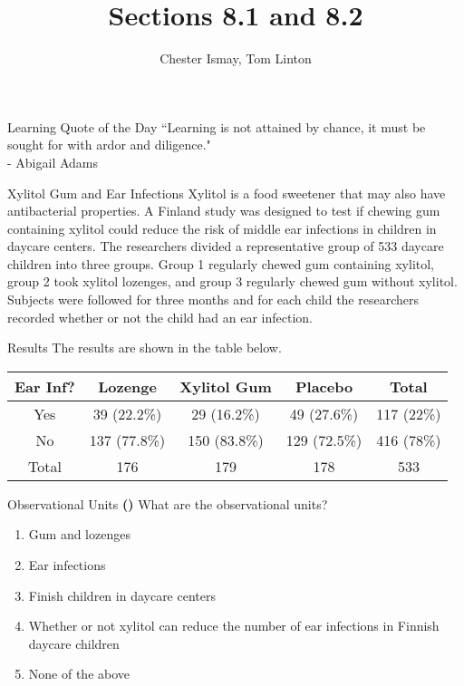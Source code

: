 \documentclass[13pt]{beamer}
\title{Sections 8.1 and 8.2 }
\author{Chester Ismay, Tom Linton}
\institute{Ripon College, Central College}
\date{}
\newcounter{count}
\newcommand{\quotes}[2]{\centering \Large{``#1"\\
\vspace*{0.2in}
\hspace*{0.5in} - #2}}
\newcommand{\question}{ \textbf{(\decimal{count})} \stepcounter{count}}
\newenvironment{click}{\begin{enumerate}[A]}{\end{enumerate}}
\begin{document}
\begin{frame}
  \titlepage
\end{frame}


\begin{frame}{Learning Quote of the Day}
\quotes{Learning is not attained by chance, it must be sought for with ardor and diligence.}{Abigail Adams}

\end{frame}

\begin{frame}{Xylitol Gum and Ear Infections}
Xylitol is a food sweetener that may also have antibacterial properties. A Finland study was designed to test if chewing gum containing xylitol could reduce the risk of middle ear infections in children in daycare centers. The researchers divided a representative group of 533 daycare children into three groups. Group 1 regularly chewed gum containing xylitol, group 2 took xylitol lozenges, and group 3 regularly chewed gum without xylitol. Subjects were followed for three months and for each child the researchers recorded whether or not the child had an ear infection.
\end{frame}

\begin{frame}{Results}
The results are shown in the table below.
\begin{center}
\begin{tabular}
[c]{|c||c|c|c|c|}\hline
Ear Inf? & Lozenge & Xylitol Gum & Placebo & Total\\\hline
Yes & 39 (22.2\%) & 29 (16.2\%) & 49 (27.6\%) & 117 (22\%)\\\hline
No & 137 (77.8\%) & 150 (83.8\%) & 129 (72.5\%) & 416 (78\%)\\\hline
Total & 176 & 179 & 178 & 533\\\hline
\end{tabular}
\end{center}
\end{frame}

\begin{frame}{Observational Units}
\question What are the observational units?
\begin{click}
   \item Gum and lozenges
   \item Ear infections
   \item Finish children in daycare centers%
   \item Whether or not xylitol can reduce the number of ear infections in Finnish daycare children
   \item None of the above
\end{click}
\end{frame}
\end{document}
